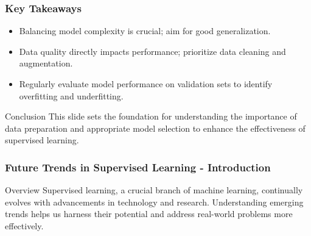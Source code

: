 \documentclass[aspectratio=169]{beamer}
\begin{document}
\begin{frame}[fragile]
    \frametitle{Key Takeaways}
    \begin{itemize}
        \item Balancing model complexity is crucial; aim for good generalization.
        \item Data quality directly impacts performance; prioritize data cleaning and augmentation.
        \item Regularly evaluate model performance on validation sets to identify overfitting and underfitting.
    \end{itemize}
    
    \begin{block}{Conclusion}
        This slide sets the foundation for understanding the importance of data preparation and appropriate model selection to enhance the effectiveness of supervised learning.
    \end{block}
\end{frame}

\begin{frame}[fragile]
    \frametitle{Future Trends in Supervised Learning - Introduction}
    \begin{block}{Overview}
        Supervised learning, a crucial branch of machine learning, continually evolves with advancements in technology and research. Understanding emerging trends helps us harness their potential and address real-world problems more effectively.
    \end{block}
\end{frame}
\end{document}
